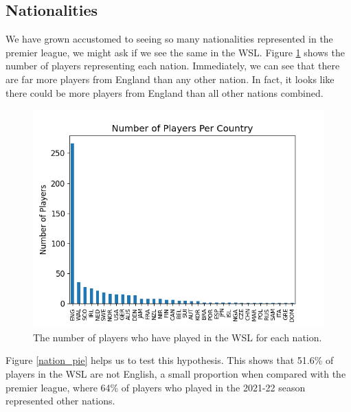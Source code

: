 \documentclass[12pt, a4paper, twocolumn]{article}
\begin{document}
\subsection{Nationalities}

We have grown accustomed to seeing so many nationalities represented in the premier league, we might ask if we see the same in the WSL. Figure \ref{nation_bar} shows the number of players representing each nation. Immediately, we can see that there are far more players from England than any other nation. In fact, it looks like there could be more players from England than all other nations combined.

\begin{figure}
  \includegraphics[width=\linewidth]{../vis/playerStats/nation_bar.png}
  \caption{The number of players who have played in the WSL for each nation.}
  \label{nation_bar}
\end{figure}

Figure \ref{nation_pie} helps us to test this hypothesis. This shows that 51.6\% of players in the WSL are not English, a small proportion when compared with the premier league, where 64\% of players who played in the 2021-22 season represented other nations\cite{foreign}. 
\end{document}
